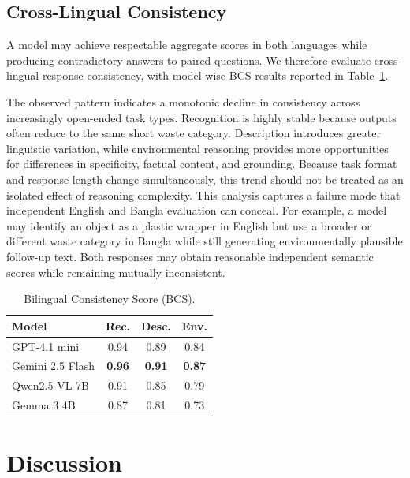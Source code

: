 \documentclass{article}
\begin{document}
\subsection{Cross-Lingual Consistency}
\label{subsec:bcs_results}
A model may achieve respectable aggregate scores in both languages while producing contradictory answers to paired questions. We therefore evaluate cross-lingual response consistency, with model-wise BCS results reported in Table~\ref{tab:bcs_results}.

The observed pattern indicates a monotonic decline in consistency across increasingly open-ended task types. Recognition is highly stable because outputs often reduce to the same short waste category. Description introduces greater linguistic variation, while environmental reasoning provides more opportunities for differences in specificity, factual content, and grounding. Because task format and response length change simultaneously, this trend should not be treated as an isolated effect of reasoning complexity. This analysis captures a failure mode that independent English and Bangla evaluation can conceal. For example, a model may identify an object as a plastic wrapper in English but use a broader or different waste category in Bangla while still generating environmentally plausible follow-up text. Both responses may obtain reasonable independent semantic scores while remaining mutually inconsistent.
\begin{table}[htb]
\centering
\caption{Bilingual Consistency Score (BCS). }
\label{tab:bcs_results}
\begin{tabular}{lccc}
\toprule
\textbf{Model}
&
\textbf{Rec.}
&
\textbf{Desc.}
&
\textbf{Env.} \\
\midrule
GPT-4.1 mini
& 0.94
& 0.89
& 0.84 \\

Gemini 2.5 Flash
& \textbf{0.96}
& \textbf{0.91}
& \textbf{0.87} \\

Qwen2.5-VL-7B
& 0.91
& 0.85
& 0.79 \\

Gemma 3 4B
& 0.87
& 0.81
& 0.73 \\
\bottomrule
\end{tabular}
\end{table}


%
\section{Discussion}
\label{sec:discussion}
%
\end{document}
